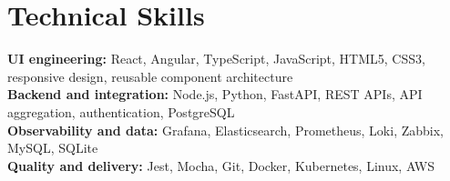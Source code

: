 \section{Technical Skills}
\textbf{UI engineering:} React, Angular, TypeScript, JavaScript, HTML5, CSS3,
responsive design, reusable component architecture\\
\textbf{Backend and integration:} Node.js, Python, FastAPI, REST APIs, API
aggregation, authentication, PostgreSQL\\
\textbf{Observability and data:} Grafana, Elasticsearch, Prometheus, Loki,
Zabbix, MySQL, SQLite\\
\textbf{Quality and delivery:} Jest, Mocha, Git, Docker, Kubernetes, Linux,
AWS
